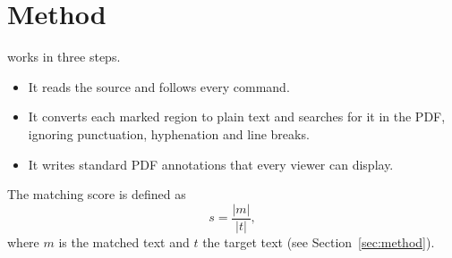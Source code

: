 \section{Method}
\ours works in three steps.
\begin{itemize}
  \item It reads the source and follows every \verb|| command.
  \item {\color{revcolor} %
  It converts each marked region to plain text and searches for it in the PDF, ignoring
  punctuation, hyphenation and line breaks.}
  \item It writes standard PDF annotations that every viewer can display.
\end{itemize}

{\color{revcolor}
The matching score is defined as
\begin{equation}
  s = \frac{|m|}{|t|},
\end{equation}
where $m$ is the matched text and $t$ the target text (see Section~\ref{sec:method}).}
\label{sec:method}
